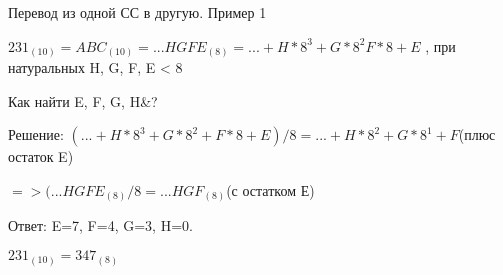 \documentclass{beamer}
\begin{document}
\hspace*{\fill} \Large{\color{blue}П\color{black}еревод из одной СС в другую. Пример 1 }
\begin{center}
    
\begin{math}
    231_{(10)} = ABC_{(10)} = ...HGFE_{(8)} = ...+ H*8^3 + G*8^2 F*8 + E
\end{math}
, при натуральных H, G, F, E < 8

\color{teal}Как найти E, F, G, H&?

\color{black}
Решение: \begin{math}
    (...+ H*8^3 + G*8^2 + F*8 + E)/8 = ...+ H*8^2 + G * 8^1 + F  
\end{math}(плюс остаток E) 

\begin{math}
    => (...HGFE_{(8)}/8 = ...HGF_{(8)}
\end{math}(с остатком Е)

\hspace{10}


\hspace{10}


\color{teal}Ответ: \color{black} E=7, F=4, G=3, H=0.

\begin{math}
    231_{(10)} = 347_{(8)}
\end{math}
\end{center}
\end{document}
